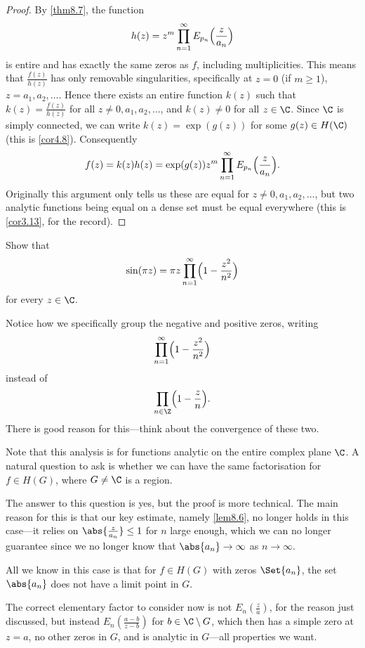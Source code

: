 \begin{proof}
	By \autoref{thm8.7}, the function
	\[
		h(z) = z^m \prod_{n = 1}^\infty E_{p_n}\Bigl( \frac{z}{a_n} \Bigr)
	\]
	is entire and has exactly the same zeros as $f$, including multiplicities.
	This means that $\frac{f(z)}{h(z)}$ has only removable singularities, specifically at $z = 0$ (if $m \geq 1$), $z = a_1, a_2, \dots$.
	Hence there exists an entire function $k(z)$ such that $k(z) = \frac{f(z)}{h(z)}$ for all $z \neq 0, a_1, a_2, \dots$, and $k(z) \neq 0$ for all $z \in \C$.
	Since $\C$ is simply connected, we can write $k(z) = \exp(g(z))$ for some $g(z) \in H(\C)$ (this is \autoref{cor4.8}).
	Consequently
	\[
		f(z) = k(z) h(z) = \exp(g(z)) z^m \prod_{n = 1}^\infty E_{p_n} \Bigl(\frac{z}{a_n}\Bigr).
	\]
	Originally this argument only tells us these are equal for $z \neq 0, a_1, a_2, \dots$, but two analytic functions being equal on a dense set must be equal everywhere (this is \autoref{cor3.13}, for the record).
\end{proof}

\begin{exercise}
	Show that
	\[
		\sin(\pi z) = \pi z \prod_{n = 1}^\infty \Bigl( 1 - \frac{z^2}{n^2} \Bigr)
	\]
	for every $z \in \C$.

	Notice how we specifically group the negative and positive zeros, writing
	\[
		\prod_{n = 1}^\infty \Bigl( 1 - \frac{z^2}{n^2} \Bigr)
	\]
	instead of
	\[
		\prod_{n \in \Z} \Bigl( 1 - \frac{z}{n} \Bigr).
	\]
	There is good reason for this---think about the convergence of these two.
\end{exercise}

Note that this analysis is for functions analytic on the entire complex plane $\C$.
A natural question to ask is whether we can have the same factorisation for $f \in H(G)$, where $G \neq \C$ is a region.

The answer to this question is yes, but the proof is more technical.
The main reason for this is that our key estimate, namely \autoref{lem8.6}, no longer holds in this case---it relies on $\abs{\frac{z}{a_n}} \leq 1$ for $n$ large enough, which we can no longer guarantee since we no longer know that $\abs{a_n} \to \infty$ as $n \to \infty$.

All we know in this case is that for $f \in H(G)$ with zeros $\Set{a_n}$, the set $\abs{a_n}$ does not have a limit point in $G$.

The correct elementary factor to consider now is not $E_n(\frac{z}{a})$, for the reason just discussed, but instead $E_n(\frac{a - b}{z - b})$ for $b \in \C \setminus G$, which then has a simple zero at $z = a$, no other zeros in $G$, and is analytic in $G$---all properties we want.

